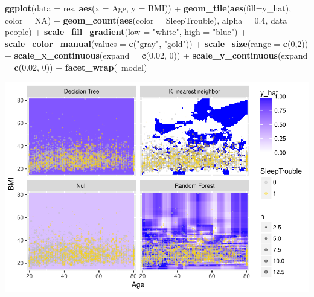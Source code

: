 \documentclass[]{article}
\newenvironment{Shaded}{\begin{snugshade}}{\end{snugshade}}
\newcommand{\KeywordTok}[1]{\textcolor[rgb]{0.13,0.29,0.53}{\textbf{{#1}}}}
\newcommand{\DataTypeTok}[1]{\textcolor[rgb]{0.13,0.29,0.53}{{#1}}}
\newcommand{\DecValTok}[1]{\textcolor[rgb]{0.00,0.00,0.81}{{#1}}}
\newcommand{\FloatTok}[1]{\textcolor[rgb]{0.00,0.00,0.81}{{#1}}}
\newcommand{\StringTok}[1]{\textcolor[rgb]{0.31,0.60,0.02}{{#1}}}
\newcommand{\OtherTok}[1]{\textcolor[rgb]{0.56,0.35,0.01}{{#1}}}
\newcommand{\NormalTok}[1]{{#1}}
\begin{document}
\begin{Shaded}
\begin{Highlighting}[]
\KeywordTok{ggplot}\NormalTok{(}\DataTypeTok{data =} \NormalTok{res, }\KeywordTok{aes}\NormalTok{(}\DataTypeTok{x =} \NormalTok{Age, }\DataTypeTok{y =} \NormalTok{BMI)) +}
\StringTok{  }\KeywordTok{geom_tile}\NormalTok{(}\KeywordTok{aes}\NormalTok{(}\DataTypeTok{fill=}\NormalTok{y_hat), }\DataTypeTok{color =} \OtherTok{NA}\NormalTok{) +}
\StringTok{  }\KeywordTok{geom_count}\NormalTok{(}\KeywordTok{aes}\NormalTok{(}\DataTypeTok{color =} \NormalTok{SleepTrouble), }\DataTypeTok{alpha =} \FloatTok{0.4}\NormalTok{, }\DataTypeTok{data =} \NormalTok{people) +}
\StringTok{  }\KeywordTok{scale_fill_gradient}\NormalTok{(}\DataTypeTok{low =} \StringTok{"white"}\NormalTok{, }\DataTypeTok{high =} \StringTok{"blue"}\NormalTok{) +}
\StringTok{  }\KeywordTok{scale_color_manual}\NormalTok{(}\DataTypeTok{values =} \KeywordTok{c}\NormalTok{(}\StringTok{"gray"}\NormalTok{, }\StringTok{"gold"}\NormalTok{)) +}
\StringTok{  }\KeywordTok{scale_size}\NormalTok{(}\DataTypeTok{range =} \KeywordTok{c}\NormalTok{(}\DecValTok{0}\NormalTok{,}\DecValTok{2}\NormalTok{)) +}
\StringTok{  }\KeywordTok{scale_x_continuous}\NormalTok{(}\DataTypeTok{expand =} \KeywordTok{c}\NormalTok{(}\FloatTok{0.02}\NormalTok{, }\DecValTok{0}\NormalTok{)) +}
\StringTok{  }\KeywordTok{scale_y_continuous}\NormalTok{(}\DataTypeTok{expand =} \KeywordTok{c}\NormalTok{(}\FloatTok{0.02}\NormalTok{, }\DecValTok{0}\NormalTok{)) +}
\StringTok{  }\KeywordTok{facet_wrap}\NormalTok{(~model)}
\end{Highlighting}
\end{Shaded}

\includegraphics{Hmwk7AnswerKey_files/figure-latex/unnamed-chunk-12-1.pdf}
\end{document}
